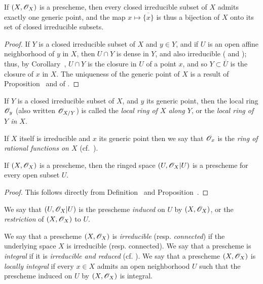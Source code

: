 \begin{prop}[2.1.5]
\label{1.2.1.5}
If $(X,\mathscr{O}_X)$ is a prescheme, then every closed irreducible subset of $X$ admits exactly one generic point, and the map $x\mapsto\overline{\{x\}}$ is thus a bijection of $X$ onto its set of closed irreducible subsets.
\end{prop}

\begin{proof}
\label{proof-1.2.1.5}
If $Y$ is a closed irreducible subset of $X$ and $y\in Y$, and if $U$ is an open affine neighborhood of $y$ in $X$, then $U\cap Y$ is dense in $Y$, and also irreducible ( and );
thus, by Corollary~, $U\cap Y$ is the closure in $U$ of a point $x$, and so $Y\subset\overline{U}$ is the closure of $x$ in $X$.
The uniqueness of the generic point of $X$ is a result of Proposition~ and of .
\end{proof}

\begin{env}[2.1.6]
\label{1.2.1.6}
If $Y$ is a closed irreducible subset of $X$, and $y$ its generic point, then the local ring $\mathscr{O}_y$ (also written $\mathscr{O}_{X/Y}$) is called the \emph{local ring of $X$ along $Y$}, or the \emph{local ring of $Y$ in $X$}.

If $X$ itself is irreducible and $x$ its generic point then we say that $\mathscr{O}_x$ is the \emph{ring of rational functions on $X$} (cf.~).
\end{env}

\begin{prop}[2.1.7]
\label{1.2.1.7}
If $(X,\mathscr{O}_X)$ is a prescheme, then the ringed space $(U,\mathscr{O}_X|U)$ is a prescheme for every open subset $U$.
\end{prop}

\begin{proof}
\label{proof-1.2.1.7}
This follows directly from Definition~ and Proposition~.
\end{proof}

We say that $(U,\mathscr{O}_X|U)$ is the prescheme \emph{induced} on $U$ by $(X,\mathscr{O}_X)$, or the \emph{restriction} of $(X,\mathscr{O}_X)$ to $U$.

\begin{env}[2.1.8]
\label{1.2.1.8}
We say that a prescheme $(X,\mathscr{O}_X)$ is \emph{irreducible} (resp. \emph{connected}) if the underlying space $X$ is irreducible (resp. connected).
We say that a prescheme is \emph{integral} if it is \emph{irreducible and reduced} (cf. ).
We say that a prescheme $(X,\mathscr{O}_X)$ is \emph{locally integral} if every $x\in X$ admits an open neighborhood $U$ such that the prescheme induced on $U$ by $(X,\mathscr{O}_X)$ is integral.
\end{env}

